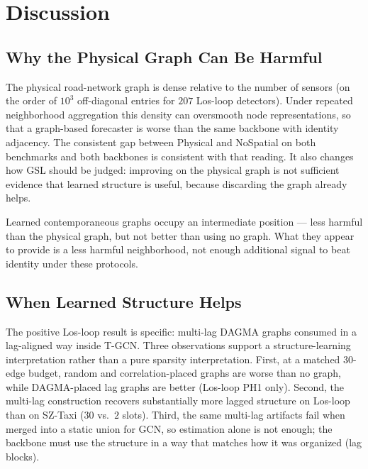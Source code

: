 \section{Discussion}\label{sec:discussion}

\subsection{Why the Physical Graph Can Be Harmful}\label{sec:disc-dense}

The physical road-network graph is dense relative to the number of sensors
(on the order of $10^3$ off-diagonal entries for $207$ Los-loop detectors).
Under repeated neighborhood aggregation this density can oversmooth node
representations, so that a graph-based forecaster is worse than the same
backbone with identity adjacency. The consistent gap between Physical and
NoSpatial on both benchmarks and both backbones is consistent with that
reading. It also changes how GSL should be judged: improving on the
physical graph is not sufficient evidence that learned structure is useful,
because discarding the graph already helps.

Learned contemporaneous graphs occupy an intermediate position --- less
harmful than the physical graph, but not better than using no graph. What
they appear to provide is a less harmful neighborhood, not enough
additional signal to beat identity under these protocols.

\subsection{When Learned Structure Helps}\label{sec:disc-help}

The positive Los-loop result is specific: multi-lag DAGMA graphs consumed
in a lag-aligned way inside T-GCN. Three observations support a
structure-learning interpretation rather than a pure sparsity
interpretation. First, at a matched $30$-edge budget, random and
correlation-placed graphs are worse than no graph, while DAGMA-placed lag
graphs are better (Los-loop PH1 only). Second, the multi-lag construction
recovers substantially more lagged structure on Los-loop than on SZ-Taxi
($30$ vs.\ $2$ slots). Third, the same multi-lag artifacts fail when merged
into a static union for GCN, so estimation alone is not enough; the
backbone must use the structure in a way that matches how it was organized
(lag blocks).

